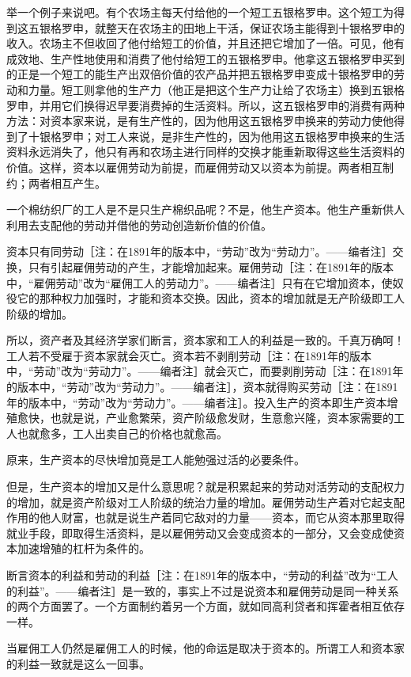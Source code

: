 \documentclass[a4paper,twoside,12pt]{ctexart}
\begin{document}
举一个例子来说吧。有个农场主每天付给他的一个短工五银格罗申。这个短工为得到这五银格罗申，就整天在农场主的田地上干活，保证农场主能得到十银格罗申的收入。农场主不但收回了他付给短工的价值，并且还把它增加了一倍。可见，他有成效地、生产性地使用和消费了他付给短工的五银格罗申。他拿这五银格罗申买到的正是一个短工的能生产出双倍价值的农产品并把五银格罗申变成十银格罗申的劳动和力量。短工则拿他的生产力（他正是把这个生产力让给了农场主）换到五银格罗申，并用它们换得迟早要消费掉的生活资料。所以，这五银格罗申的消费有两种方法：对资本家来说，是有生产性的，因为他用这五银格罗申换来的劳动力使他得到了十银格罗申；对工人来说，是非生产性的，因为他用这五银格罗申换来的生活资料永远消失了，他只有再和农场主进行同样的交换才能重新取得这些生活资料的价值。这样，资本以雇佣劳动为前提，而雇佣劳动又以资本为前提。两者相互制约；两者相互产生。

一个棉纺织厂的工人是不是只生产棉织品呢？不是，他生产资本。他生产重新供人利用去支配他的劳动并借他的劳动创造新价值的价值。

资本只有同劳动［注：在1891年的版本中，“劳动”改为“劳动力”。——编者注］交换，只有引起雇佣劳动的产生，才能增加起来。雇佣劳动［注：在1891年的版本中，“雇佣劳动”改为“雇佣工人的劳动力”。——编者注］只有在它增加资本，使奴役它的那种权力加强时，才能和资本交换。因此，资本的增加就是无产阶级即工人阶级的增加。

所以，资产者及其经济学家们断言，资本家和工人的利益是一致的。千真万确呵！工人若不受雇于资本家就会灭亡。资本若不剥削劳动［注：在1891年的版本中，“劳动”改为“劳动力”。——编者注］就会灭亡，而要剥削劳动［注：在1891年的版本中，“劳动”改为“劳动力”。——编者注］，资本就得购买劳动［注：在1891年的版本中，“劳动”改为“劳动力”。——编者注］。投入生产的资本即生产资本增殖愈快，也就是说，产业愈繁荣，资产阶级愈发财，生意愈兴隆，资本家需要的工人也就愈多，工人出卖自己的价格也就愈高。

原来，生产资本的尽快增加竟是工人能勉强过活的必要条件。

但是，生产资本的增加又是什么意思呢？就是积累起来的劳动对活劳动的支配权力的增加，就是资产阶级对工人阶级的统治力量的增加。雇佣劳动生产着对它起支配作用的他人财富，也就是说生产着同它敌对的力量——资本，而它从资本那里取得就业手段，即取得生活资料，是以雇佣劳动又会变成资本的一部分，又会变成使资本加速增殖的杠杆为条件的。

断言资本的利益和劳动的利益［注：在1891年的版本中，“劳动的利益”改为“工人的利益”。——编者注］是一致的，事实上不过是说资本和雇佣劳动是同一种关系的两个方面罢了。一个方面制约着另一个方面，就如同高利贷者和挥霍者相互依存一样。

当雇佣工人仍然是雇佣工人的时候，他的命运是取决于资本的。所谓工人和资本家的利益一致就是这么一回事。
\end{document}
